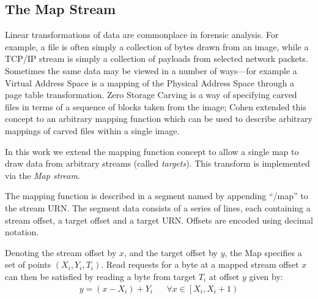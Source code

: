 \documentclass[10pt, conference]{IEEEtran}
\begin{document}


\subsection{The Map Stream}
\label{map_stream}
Linear transformations of data are commonplace in forensic
analysis. For example, a file is often simply a collection of bytes
drawn from an image, while a TCP/IP stream is simply a collection of
payloads from selected network packets. Sometimes the same data may be
viewed in a number of ways---for example a Virtual Address Space is a
mapping of the Physical Address Space through a page table
transformation.  Zero Storage Carving\cite{Meijer2006} is a way of
specifying carved files in terms of a sequence of blocks taken from
the image; Cohen extended this concept to an arbitrary mapping
function\cite{1363239,Cohen2007} which can be used to describe
arbitrary mappings of carved files within a single image.

In this work we extend the mapping function concept to allow a single
map to draw data from arbitrary streams (called {\em targets}). This
transform is implemented via the {\em Map stream}.

The mapping function is described in a segment named by appending
``/map'' to the stream URN. The segment data consists of a series of
lines, each containing a stream offset, a target offset and a target
URN. Offsets are encoded using decimal notation.

Denoting the stream offset by $x$, and the target offset by $y$, the
Map specifies a set of points $(X_i,Y_i,T_i)$. Read requests for a
byte at a mapped stream offset $x$ can then be satisfied by reading a
byte from target $T_i$ at offset $y$ given by:
\begin{eqnarray}
y = (x - X_i) + Y_i & &
\forall x \in \left [X_i, X_i+1 \right )
\end{eqnarray}
\end{document}
